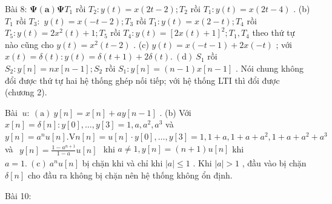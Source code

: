 \documentclass[
  10
]{article}
\begin{document}
Bài 8: \(\mathbf { \Psi } ( \mathbf { a } ) \mathbf { \Psi } T _ { 1 }\)
rồi \(T _ { 2 } \colon y ( t ) = x ( 2 t - 2 ) ; T _ { 2 }\) rồi
\(T _ { 1 } \colon y ( t ) = x ( 2 t - 4 )\) . (b) \(T _ { 1 }\) rồi
\(T _ { 3 } { \mathrm { : } }\) \(y ( t ) = x ( - t - 2 ) ; T _ { 3 }\)
rồi \(T _ { 1 } \colon y ( t ) = x ( 2 - t ) ; T _ { 4 }\) rồi
\(T _ { 5 } \colon y ( t ) = 2 x ^ { 2 } ( t ) + 1 ; T _ { 5 }\) rồi
\(T _ { 4 } \colon y ( t ) = [ 2 x ( t ) + 1 ] ^ { 2 } ; T _ { 1 } , T _ { 4 }\)
theo thứ tự nào cũng cho \(y ( t ) = x ^ { 2 } ( t - 2 )\) . (c)
\(y ( t ) = x ( - t - 1 ) + 2 x ( - t )\) ; với
\(x ( t ) = \delta ( t ) \colon y ( t ) = \delta ( t + 1 ) + 2 \delta ( t ) . \mathrm { ~ ( d ) ~ } S _ { 1 }\)
rồi \(S _ { 2 } \colon y [ n ] = n x [ n - 1 ] ; S _ { 2 }\) rồi
\(S _ { 1 } \colon y [ n ] = ( n - 1 ) x [ n - 1 ]\) . Nói chung không
đổi được thứ tự hai hệ thống ghép nối tiếp; với hệ thống LTI thì đổi
được (chương 2).

Bài
\(\ u { \mathrm { : ~ } } ( \mathrm { a } ) \ y [ n ] = x [ n ] + a y [ n - 1 ]\)
. (b) Với
\(x [ n ] = \delta [ n ] \colon y [ 0 ] , \ldots , y [ 3 ] = 1 , a , a ^ { 2 } , a ^ { 3 }\)
và
\(y [ n ] = a ^ { n } u [ n ] . { \mathrm { V } } \dot { \mathrm { } } { \mathrm { } } { \mathrm { } } n [ n ] = u [ n ] \cdot y [ 0 ] , \ldots , y [ 3 ] = 1 , 1 + a , 1 + a + a ^ { 2 } , 1 + a + a ^ { 2 } + a ^ { 3 }\)
và
\(\begin{array} { r } { y [ n ] = \frac { 1 - a ^ { n + 1 } } { 1 - a } u [ n ] } \end{array}\)
khi \(a \neq 1 , y [ n ] = ( n + 1 ) u [ n ]\) khi
\(a = 1 . ~ ( \mathrm { c } ) ~ a ^ { n } u [ n ]\) bị chặn khi và chỉ
khi \(| a | \le 1\) . Khi \(| a | > 1\) , đầu vào bị chặn
\(\delta [ n ]\) cho đầu ra không bị chặn nên hệ thống không ổn định.

Bài 10:
\end{document}
